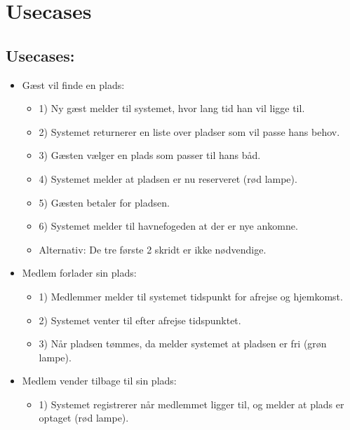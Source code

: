 \section{Usecases}

\subsection{Usecases:}

\begin{itemize}
  \item Gæst vil finde en plads:
  \begin{itemize}
    \item 1) Ny gæst melder til systemet, hvor lang tid han vil ligge til.
    \item 2) Systemet returnerer en liste over pladser som vil passe hans behov.
    \item 3) Gæsten vælger en plads som passer til hans båd.
    \item 4) Systemet melder at pladsen er nu reserveret (rød lampe).
    \item 5) Gæsten betaler for pladsen.
    \item 6) Systemet melder til havnefogeden at der er nye ankomne.

    \item Alternativ: De tre første 2 skridt er ikke nødvendige.
  \end{itemize}

  \item Medlem forlader sin plads:
  \begin{itemize}
    \item 1) Medlemmer melder til systemet tidspunkt for afrejse og hjemkomst.
    \item 2) Systemet venter til efter afrejse tidspunktet.
    \item 3) Når pladsen tømmes, da melder systemet at pladsen er fri (grøn lampe).
  \end{itemize}

  \item Medlem vender tilbage til sin plads:
  \begin{itemize}
    \item 1) Systemet registrerer når medlemmet ligger til, og melder at plads er optaget (rød lampe).
  \end{itemize}


\end{itemize}
